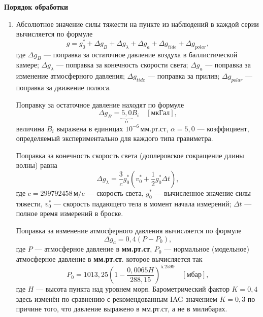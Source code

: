 \documentclass[12pt, a4paper]{article}
\theoremstyle{remark}
\begin{document}
\begin{center}
    \textbf{Порядок обработки}
\end{center}
\begin{enumerate}
    \item 
Абсолютное значение силы тяжести на пункте из наблюдений в каждой серии вычисляется по формуле
\begin{equation*}
    g = g^*_0 + \Delta g_B + \Delta g_{\lambda} + \Delta g_a  + \Delta g_{tide} + \Delta g_{polar},
\end{equation*}
где $\Delta g_B$ --- поправка за остаточное давление воздуха в баллистической камере; $\Delta
g_{\lambda}$
--- поправка за конечность скорости света; $\Delta g_a$ --- поправка за изменение атмосферного
давления; $\Delta g_{tide}$ --- поправка за прилив; $\Delta g_{polar}$ --- поправка за движение
полюса.

Поправку за остаточное давление находят по формуле
\begin{equation*}
    \Delta g_B = \underbrace{5,0}_\alpha B_i\quad[\text{мкГал}],
\end{equation*}
величина $B_i$ выражена в единицах $10^{-6}\,\text{мм.рт.ст}$, $\alpha = 5,0$ --- коэффициент,
определяемый экспериментально для каждого типа гравиметра. 

Поправка за конечность скорость света (доплеровское сокращение  длины волны) равна
\begin{equation*}
    \Delta g_\lambda = \dfrac{3}{c} g_0^* \left( v_0^* + \dfrac{1}{2}g_0^* \Delta t\right),
\end{equation*}
где $c = 299 792 458\,\text{м/c}$ --- скорость света, $g_0^*$ --- вычисленное значение силы тяжести, 
$v_0^*$ --- скорость падающего тела в момент начала измерений; 
$\Delta t$ --- полное время измерений в броске.

Поправка за изменение атмосферного давления вычисляется по формуле
\begin{equation*}
    \Delta g_a = 0,4 \left( P - P_0 \right),
\end{equation*}
где $P$ --- атмосферное давление в \textbf{мм.рт.ст}, $P_0$ --- нормальное
(модельное) атмосферное давление в \textbf{мм.рт.ст}.
которое вычисляется так
\begin{equation*}
    P_0 = 1013,25 \left( 1 - \dfrac{0,0065 H}{288,15} \right)^{5.2599}\quad[\textbf{мбар}],
\end{equation*}
где $H$ --- высота пункта над уровнем моря. Барометрический фактор $K = 0,4$ здесь изменён по
сравнению с рекомендованным IAG значением $K = 0,3$ по причине того, что давление выражено в мм.рт.ст, 
а не в милибарах.


\end{enumerate}
\end{document}
